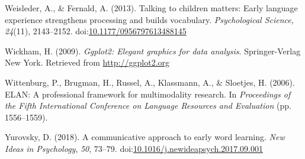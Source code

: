 \documentclass[floatsintext,man]{apa6}
\theoremstyle{definition}
\theoremstyle{definition}
\theoremstyle{definition}
\theoremstyle{remark}
\begin{document}
\hypertarget{ref-weisleder2013talking}{}
Weisleder, A., \& Fernald, A. (2013). Talking to children matters: Early
language experience strengthens processing and builds vocabulary.
\emph{Psychological Science}, \emph{24}(11), 2143--2152.
doi:\href{https://doi.org/10.1177/0956797613488145}{10.1177/0956797613488145}

\hypertarget{ref-R-ggplot2}{}
Wickham, H. (2009). \emph{Ggplot2: Elegant graphics for data analysis}.
Springer-Verlag New York. Retrieved from \url{http://ggplot2.org}

\hypertarget{ref-ELAN}{}
Wittenburg, P., Brugman, H., Russel, A., Klassmann, A., \& Sloetjes, H.
(2006). ELAN: A professional framework for multimodality research. In
\emph{Proceedings of the Fifth International Conference on Language
Resources and Evaluation} (pp. 1556--1559).

\hypertarget{ref-yurovsky2018communicative}{}
Yurovsky, D. (2018). A communicative approach to early word learning.
\emph{New Ideas in Psychology}, \emph{50}, 73--79.
doi:\href{https://doi.org/10.1016/j.newideapsych.2017.09.001}{10.1016/j.newideapsych.2017.09.001}

\endgroup
\end{document}
